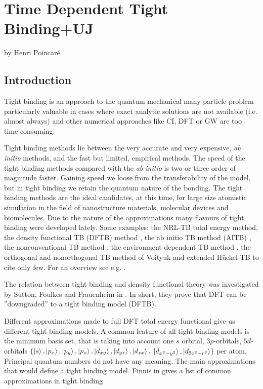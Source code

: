 \chapter[TDTB+UJ]%
{Time Dependent Tight Binding+UJ}
\label{ch:one}
%
{by Henri Poincar\'e}
%
\section{Introduction}
\par{Tight binding is an approach to the quantum mechanical many particle problem particularly valuable in cases
where exact analytic solutions are not available (i.e. almost always) and other numerical approaches
like CI, DFT or GW are too time-consuming.}
\par{Tight binding methods lie between the very accurate and very expensive,
\emph{ab initio} methods, and the fast but limited, empirical methods. The
speed of the tight binding methods compared with the \emph{ab initio} is two
or three order of magnitude faster. Gaining speed we loose from the
transferability of the model, but in tight binding we retain the quantum
nature of the bonding. The tight binding methods are the ideal candidates, at
this time, for large size atomistic simulation in the field of nanostructure materials, molecular devices and biomolecules. Due to the nature of the approximations many flavours of tight binding were developed lately. Some examples: the NRL-TB total energy method\citep{Mehl96}, the density functional TB (DFTB) method \citep{Frauenheim00,Elstner98,Elstner07,Seifert07}, the ab initio TB method (AITB) \citep{Sankey89, Horsfield97, Tu06}, the nonconventional TB method \citep{Khakimov05}, the environment dependent TB method \citep{Tang96}, the orthogonal and nonorthogonal TB method of Voityuk \citep{Voityuk06,Voityuk06b} and extended H\"{u}ckel TB\citep{Rincon08} to cite only few. For an overview see e.g. \citep{Finnis03,Goringe97b}.}
\par{The relation between tight binding and density functional theory was
  investigated by Sutton, Foulkes and Frauenheim in \citep{Sutton88,Foulkes89,Frauenheim00}. In short, they
  prove that DFT can be ''downgraded'' to a tight binding model (DFTB).}
\par{Different approximations made to full DFT total energy functional give us
different tight binding models. A common feature of all tight binding models
is the minimum basis set, that is taking into account  one $s$ orbital,
$3p$-orbitals, $5d$-orbitals
$\{\mathinner{|{s}\rangle},\mathinner{|{p_x}\rangle},\mathinner{|{p_y}\rangle},\mathinner{|{p_x}\rangle},\mathinner{|{d_{xy}}\rangle},\mathinner{|{d_{yz}}\rangle},\mathinner{|{d_{zx}}\rangle},$
$\mathinner{|{d_{x^2-y^2}}\rangle},\mathinner{|{d_{3z^2-r^2}}\rangle}\}$
per atom. Principal quantum numbers do not have any meaning. The main
approximations that would define a tight binding model. Finnis in \citep{Finnis03} gives a list of common  approximations in tight binding} 
